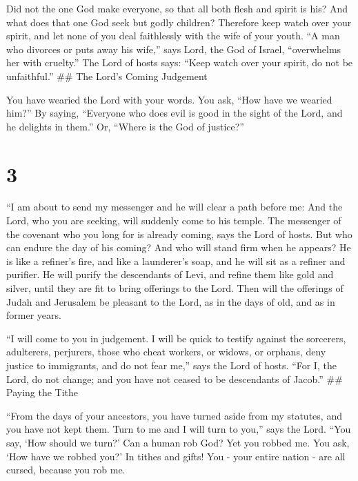  Did not the one God make everyone, so that all both flesh
and spirit is his? And what does that one God seek but godly children?
Therefore keep watch over your spirit, and let none of you deal
faithlessly with the wife of your youth.  ``A man who
divorces or puts away his wife,'' says Lord, the God of Israel,
``overwhelms her with cruelty.'' The Lord of hosts says: ``Keep watch
over your spirit, do not be unfaithful.'' \#\# The Lord's Coming
Judgement

 You have wearied the Lord with your words. You ask, ``How
have we wearied him?'' By saying, ``Everyone who does evil is good in
the sight of the Lord, and he delights in them.'' Or, ``Where is the God
of justice?''

\hypertarget{section-2}{%
\section{3}\label{section-2}}

 ``I am about to send my messenger and he will clear a path
before me: And the Lord, who you are seeking, will suddenly come to his
temple. The messenger of the covenant who you long for is already
coming, says the Lord of hosts.  But who can endure the day
of his coming? And who will stand firm when he appears? He is like a
refiner's fire, and like a launderer's soap,  and he will
sit as a refiner and purifier. He will purify the descendants of Levi,
and refine them like gold and silver, until they are fit to bring
offerings to the Lord.  Then will the offerings of Judah and
Jerusalem be pleasant to the Lord, as in the days of old, and as in
former years.

 ``I will come to you in judgement. I will be quick to
testify against the sorcerers, adulterers, perjurers, those who cheat
workers, or widows, or orphans, deny justice to immigrants, and do not
fear me,'' says the Lord of hosts.  ``For I, the Lord, do
not change; and you have not ceased to be descendants of Jacob.'' \#\#
Paying the Tithe

 ``From the days of your ancestors, you have turned aside
from my statutes, and you have not kept them. Turn to me and I will turn
to you,'' says the Lord. ``You say, `How should we turn?' 
Can a human rob God? Yet you robbed me. You ask, `How have we robbed
you?' In tithes and gifts!  You - your entire nation - are
all cursed, because you rob me.

